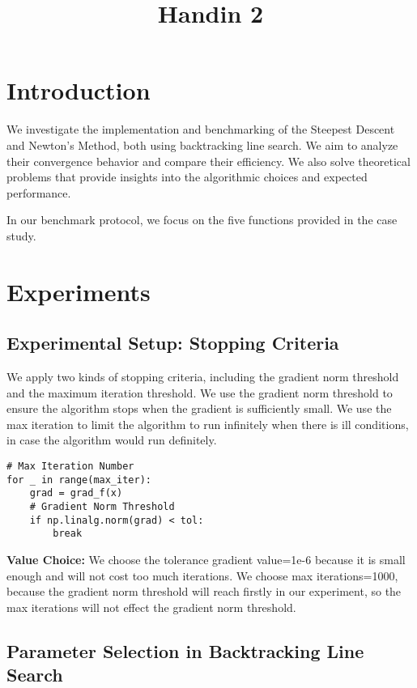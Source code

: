 \documentclass[12pt]{article}
\title{Handin 2}
\begin{document}
\maketitle

\section{Introduction}

We investigate the implementation and benchmarking of the Steepest Descent and Newton's Method, both using backtracking line search. We aim to analyze their convergence behavior and compare their efficiency.  We also solve theoretical problems that provide insights into the algorithmic choices and expected performance. 

In our benchmark protocol, we focus on the five functions provided in the case study. 

\section{Experiments}

\subsection{Experimental Setup: Stopping Criteria}
We apply two kinds of stopping criteria, including the gradient norm threshold and the maximum iteration threshold. We use the gradient norm threshold to ensure the algorithm stops when the gradient is sufficiently small. We use the max iteration to limit the algorithm to run infinitely when there is ill conditions, in case the algorithm would run definitely.

\begin{lstlisting}
# Max Iteration Number
for _ in range(max_iter): 
    grad = grad_f(x)
    # Gradient Norm Threshold 
    if np.linalg.norm(grad) < tol:
        break
\end{lstlisting}

\textbf{Value Choice: }We choose the tolerance gradient value=1e-6 because it is small enough and will not cost too much iterations. We choose max iterations=1000, because the gradient norm threshold will reach firstly in our experiment, so the max iterations will not effect the gradient norm threshold. 

\subsection{Parameter Selection in Backtracking Line Search }
\end{document}
